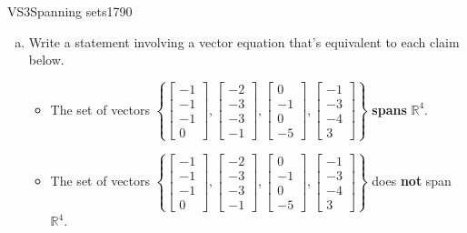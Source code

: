 \begin{exercise}{VS3}{Spanning sets}{1790} 
\begin{exerciseStatement} 

\begin{enumerate}[(a)]
\item  

 Write a statement involving a vector equation that's equivalent to each claim below. 

 

\begin{itemize}
\item  

 The set of vectors \(\left\{ \left[\begin{array}{c}
-1 \\
-1 \\
-1 \\
0
\end{array}\right] , \left[\begin{array}{c}
-2 \\
-3 \\
-3 \\
-1
\end{array}\right] , \left[\begin{array}{c}
0 \\
-1 \\
0 \\
-5
\end{array}\right] , \left[\begin{array}{c}
-1 \\
-3 \\
-4 \\
3
\end{array}\right] \right\}\) \textbf{spans} \(\mathbb R^4\). 

 
\item  

 The set of vectors \(\left\{ \left[\begin{array}{c}
-1 \\
-1 \\
-1 \\
0
\end{array}\right] , \left[\begin{array}{c}
-2 \\
-3 \\
-3 \\
-1
\end{array}\right] , \left[\begin{array}{c}
0 \\
-1 \\
0 \\
-5
\end{array}\right] , \left[\begin{array}{c}
-1 \\
-3 \\
-4 \\
3
\end{array}\right] \right\}\) does \textbf{not} span \(\mathbb R^4\). 


\end{itemize}
\end{enumerate}
\end{exerciseStatement}
\end{exercise}
